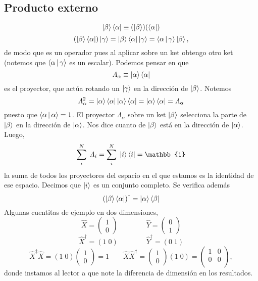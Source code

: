\documentclass[10pt,oneside]{CBFT_book}
\begin{document}
\subsection{Producto externo}

\[
	\Ket{\beta} \Bra{\alpha} \equiv (\Ket{\beta} )( \Bra{\alpha} )
\]
\[
	( \Ket{\beta} \Bra{\alpha} )\Ket{\gamma} = \Ket{\beta} \Bra{\alpha} \Ket{\gamma} =
		\Braket{\alpha|\gamma} \Ket{\beta} , 
\]
de modo que es un operador pues al aplicar sobre un ket obtengo otro ket (notemos que $\Braket{\alpha|\gamma}$
es un escalar). Podemos pensar en que 
\[
	\Lambda_\alpha \equiv \Ket{\alpha}\Bra{\alpha}
\]
es el proyector, que actúa rotando un $\Ket{\gamma}$ en la dirección de $\Ket{\beta}$. Notemos 
\[
	\Lambda_\alpha^2 = \Ket{\alpha}\Bra{\alpha}\Ket{\alpha}\Bra{\alpha} = \Ket{\alpha}\Bra{\alpha} = \Lambda_\alpha
\]
puesto que $\Braket{\alpha|\alpha}=1$. El proyector $\Lambda_\alpha$ sobre un ket $\Ket{\beta}$ selecciona la parte de
$\Ket{\beta}$ en la dirección de $\Ket{\alpha}$. Nos dice cuanto de $\Ket{\beta}$ está en la dirección de 
$\Ket{\alpha}$.
Luego,
\[
	\sum_i^N \; \Lambda_i = \sum_i^N \; \Ket{i}\Bra{i} = \mathbb{1}
\]
la suma de todos los proyectores del espacio en el que estamos es la identidad de ese espacio. Decimos que $\Ket{i}$ es 
un conjunto completo. Se verifica además
\[
	(\Ket{\beta} \Bra{\alpha})^\dagger = \Ket{\alpha} \Bra{\beta}
\]
Algunas cuentitas de ejemplo en dos dimensiones,
\[
	\hat{X} = \begin{pmatrix} 1 \\ 0 \end{pmatrix} \qquad \qquad \hat{Y} = \begin{pmatrix} 0 \\ 1 \end{pmatrix}
\]
\[
	\hat{X}^\dagger = ( 1 \; 0 ) \qquad \qquad \hat{Y}^\dagger = ( 0 \; 1  ) 
\]
\[
	\hat{X}^\dagger\hat{X} = (1 \; 0) \begin{pmatrix} 1 \\ 0 \end{pmatrix} = 1 \qquad 
	\hat{X}\hat{X}^\dagger = \begin{pmatrix} 1 \\ 0 \end{pmatrix} (1 \; 0) = 
	\begin{pmatrix} 1 & 0 \\ 0 & 0 \\ \end{pmatrix},
\]
donde instamos al lector a que note la diferencia de dimensión en los resultados.
\end{document}
